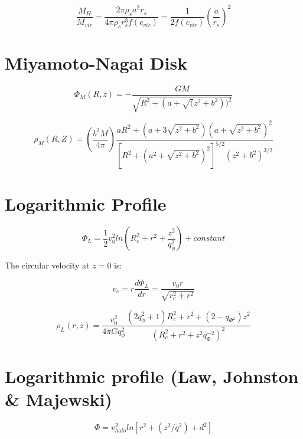 \documentclass[a4paper, 12pt]{article} %
\begin{document}
\begin{equation}
\dfrac{M_H}{M_{vir}} = \dfrac{2 \pi \rho_s a^2 r_s}{4 \pi \rho_s r_s^3 f(c_{vir})} = \dfrac{1}{2 f(c_{vir})}  \left( \dfrac{a}{r_s}\right)^2
\end{equation}

\section{Miyamoto-Nagai Disk}

\begin{equation}
\Phi_M (R, z) = - \dfrac{GM}{\sqrt{R^2 + (a + \sqrt(z^2 + b^2))^2}}
\end{equation}

\begin{equation}
\rho_M (R, Z) = \left( \dfrac{b^2 M}{4 \pi} \right) \dfrac{aR^2 + (a + 3\sqrt{z^2+b^2})(a + \sqrt{z^2+b^2})^2}{[R^2 + (a^2 + \sqrt{z^2+b^2})^2]^{5/2}(z^2+b^2)^{3/2} }
\end{equation}


\section{Logarithmic Profile}

\begin{equation}
\Phi_L = \dfrac{1}{2} v_0^2 ln \left( R_c^2 + r^2 + \dfrac{z^2}{q_{\phi}^2}  \right) + constant
\end{equation}

The circular velocity at $z=0$ is:

\begin{equation}
v_c = r \dfrac{d \Phi_L}{dr} = \dfrac{v_0 r}{\sqrt{r_c^2 + r^2}}
\end{equation}



\begin{equation}
\rho_L(r, z) =  \dfrac{v_0^2}{4 \pi G q_{\phi}^2} \dfrac{(2q_{\phi}^2 + 1)R_c^2 + r^2 + (2 - q_{\Phi^2})z^2}{(R_c^2 + r^2 + z^2q_{\Phi}^{-2})^2}
\end{equation}


\section{Logarithmic profile (Law, Johnston \& Majewski)}

\begin{equation}
\Phi = v^2_{halo} ln[r^2 + (z^2/q^2) + d^2]
\end{equation}
\end{document}
